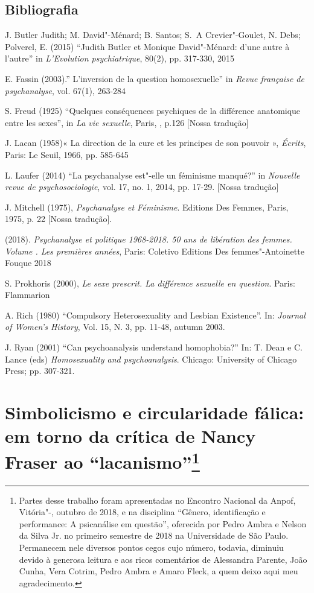 \section{Bibliografia}

J. Butler Judith; M. David"-Ménard; B. Santos; S.~A Crevier"-Goulet, N.
Debs; Polverel, E. (2015) ``Judith Butler et Monique David"-Ménard: d'une
autre à l'autre'' in \emph{L'Evolution psychiatrique}, 80(2), pp.
317-330, 2015

E. Fassin (2003).'' L'inversion de la question homosexuelle'' in
\emph{Revue française de psychanalyse}, vol. 67(1), 263-284

S. Freud (1925) ``Quelques conséquences psychiques de la différence
anatomique entre les sexes'', in \emph{La vie sexuelle}, Paris, ,
p.126 {[}Nossa tradução{]}

J. Lacan (1958)« La direction de la cure et les principes de son pouvoir
», \emph{Écrits}, Paris: Le Seuil, 1966, pp. 585-645

L. Laufer (2014) ``La psychanalyse est"-elle un féminisme manqué?'' in
\emph{Nouvelle revue de psychosociologie}, vol. 17, no. 1, 2014, pp.
17-29. {[}Nossa tradução{]}

J. Mitchell (1975), \emph{Psychanalyse et Féminisme}. Editions Des
Femmes, Paris, 1975, p. 22 {[}Nossa tradução{]}.

 (2018). \emph{Psychanalyse et politique 1968-2018. 50 ans de
libération des femmes. Volume . Les premières années}, Paris:
Coletivo Editions Des femmes"-Antoinette Fouque 2018

S. Prokhoris (2000), \emph{Le sexe prescrit. La différence sexuelle en
question}. Paris: Flammarion

A. Rich (1980) ``Compulsory Heterosexuality and Lesbian Existence''.  In:
\emph{Journal of Women's History}, Vol. 15, N. 3, pp. 11-48, autumn
2003.

J. Ryan (2001) ``Can psychoanalysis understand homophobia?'' In: T. Dean
e C. Lance (eds) \emph{Homosexuality and psychoanalysis}. Chicago:
University of Chicago Press; pp. 307-321.



\chapter*{Simbolicismo e circularidade fálica: em torno da crítica de
Nancy Fraser ao ``lacanismo''\footnote{Partes desse trabalho foram
  apresentadas no  Encontro Nacional da Anpof, Vitória"-, outubro
  de 2018, e na disciplina ``Gênero, identificação e performance: A
  psicanálise em questão'', oferecida por Pedro Ambra e Nelson da Silva
  Jr. no primeiro semestre de 2018 na Universidade de São Paulo.
  Permanecem nele diversos pontos cegos cujo número, todavia, diminuiu
  devido à generosa leitura e aos ricos comentários de Alessandra
  Parente, João Cunha, Vera Cotrim, Pedro Ambra e Amaro Fleck, a quem
  deixo aqui meu agradecimento.}}


